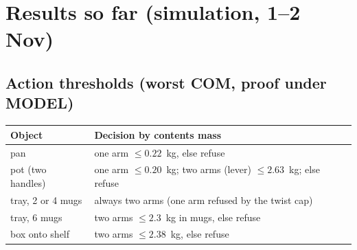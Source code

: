 \documentclass[11pt,a4paper]{article}
\begin{document}
\section{Results so far (simulation, 1--2 Nov)}
\subsection{Action thresholds (worst COM, proof under MODEL)}
\begin{center}\small
\begin{tabular}{@{}ll@{}}
\toprule
Object & Decision by contents mass\\
\midrule
pan & one arm $\le 0.22$~kg, else refuse\\
pot (two handles) & one arm $\le 0.20$~kg; two arms (lever) $\le 2.63$~kg; else refuse\\
tray, 2 or 4 mugs & always two arms (one arm refused by the twist cap)\\
tray, 6 mugs & two arms $\le 2.3$~kg in mugs, else refuse\\
box onto shelf & two arms $\le 2.38$~kg, else refuse\\
\bottomrule
\end{tabular}
\end{center}
\end{document}
